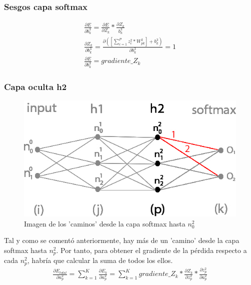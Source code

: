 \subsubsection{Sesgos capa softmax}

\begin{gather}
	\frac{\partial E}{\partial b^3_k} = \frac{\partial E}{\partial Z_k} * \frac{\partial Z_k}{b^3_k} \\
	\frac{\partial Z_k }{\partial b^3_k } = \frac{\partial ([\sum_{c=1}^{P} z^2_c * W^2_{pk}] + b^3_k) }{\partial b^3_k } = 1 \\
	\frac{\partial E}{\partial b^3_k} = gradiente\_Z_k
\end{gather}

\subsubsection{Capa oculta h2}

\begin{figure}[H]
	\centering
	\includegraphics[scale=0.35]{imagenes/nn_h2_caminos_posibles.jpg}  
	\caption{Imagen de los 'caminos' desde la capa softmax hasta $n^2_0$}
	\label{nn_h2_caminos_posibles}
\end{figure}

Tal y como se comentó anteriormente, hay más de un 'camino' desde la capa softmax hasta $n^2_p$. Por tanto, para obtener el gradiente de la pérdida respecto a cada $n^2_p$, habría que calcular la suma de todos los ellos. \\

\begin{gather}
	\frac{\partial E_{total}}{\partial a^2_p} = \sum_{k=1}^K \frac{\partial E_k}{\partial a^2_p} = \sum_{k=1}^K  gradiente\_Z_k * \frac{\partial Z_k}{\partial z^2_p} * \frac{\partial z^2_p}{\partial a^2_p}
	\label{E_total_a2p}
\end{gather}

